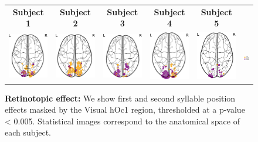\begin{figure}[ht]
\scriptsize
\vspace{2ex}
\hspace{-4ex}
\begin{tabular}{cccccl}
\textbf{\Large Subject 1} & \textbf{\Large Subject 2} & \textbf{\Large Subject 3} & \textbf{\Large Subject 4} & \textbf{\Large Subject 5} & {}\\
{\includegraphics[width=.13\linewidth]{figures/part_II/retinotopy_01.pdf}}
\hspace{1ex}
&{\includegraphics[width=.13\linewidth]{figures/part_II/retinotopy_03.pdf}}
\hspace{1ex}
&{\includegraphics[width=.13\linewidth]{figures/part_II/retinotopy_04.pdf}}
\hspace{1ex}
&{\includegraphics[width=.13\linewidth]{figures/part_II/retinotopy_05.pdf}}
\hspace{1ex}
&{\includegraphics[width=.13\linewidth]{figures/part_II/retinotopy_06.pdf}}
\hspace{-1ex}
&{\includegraphics[width=.12\linewidth]{figures/part_II/retinotopy_legend.pdf}}
\hspace{-1ex} \\
\end{tabular}
\vspace{3ex}
\caption{\textbf{Retinotopic effect:} We show first and second syllable position effects masked by the Visual hOc1 region, thresholded at a p-value < 0.005.
Statistical images correspond to the anatomical space of each subject.}
\label{fig:retinotopy}
\end{figure}



